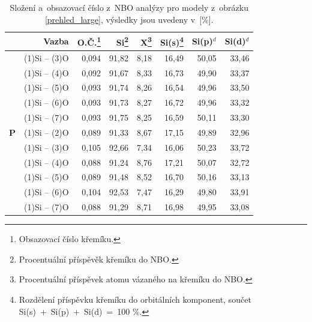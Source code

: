 \documentclass[
digital, %
table,   %
nolof,     %
nolot,     %
oneside,
]{fithesis3}
\begin{document}
\begin{table}[H]
\caption{Složení a~obsazovací číslo z~NBO analýzy pro modely z~obrázku \ref{prehled_large}, výsledky jsou uvedeny v~[\%].}
\begin{minipage}{\textwidth}
\begin{center}
\begin{tabular}{|l|r|r|r|r|r|r|r|}
\hline
\label{nbo_large}&  Vazba & O.Č.\footnote{Obsazovací číslo křemíku.} & Si\footnote{Procentuální příspěvěk křemíku do NBO.} & X\footnote{Procentuální příspěvek atomu vázaného na křemíku do NBO.} & Si(s)\footnote{Rozdělení příspěvku křemíku do orbitálních komponent, součet Si(s)~+~Si(p)~+~Si(d)~=~100 \%.} & Si(p)$^d$ &Si(d)$^d$ \\ \hline
& (1)Si -- (3)O  & 0,094 & 91,82   & 8,18   & 16,49   & 50,05   & 33,46   \\ \hline
&  (1)Si -- (4)O  & 0,092 & 91,67   & 8,33   & 16,73   & 49,90   & 33,37   \\ \hline
& (1)Si -- (5)O & 0,093 & 91,74   & 8,26   & 16,54   & 49,96   & 33,50   \\ \hline
&  (1)Si -- (6)O & 0,093 & 91,73   & 8,27   & 16,72   & 49,96   & 33,32   \\ \hline
& (1)Si -- (7)O& 0,093 & 91,75   & 8,25   & 16,59   & 50,11   & 33,30   \\ \hline
\textbf{P}& (1)Si -- (2)O  & 0,089 & 91,33   & 8,67   & 17,15   & 49,89   & 32,96   \\ \hline
&  (1)Si -- (3)O  & 0,105 & 92,66   & 7,34   & 16,06   & 50,23   & 33,72   \\ \hline
&  (1)Si -- (4)O   & 0,088 & 91,24   & 8,76   & 17,21   & 50,07   & 32,72   \\ \hline
& (1)Si -- (5)O  & 0,089 & 91,48   & 8,52   & 16,70   & 50,16   & 33,13   \\ \hline
&  (1)Si -- (6)O & 0,104 & 92,53   & 7,47   & 16,29   & 49,80   & 33,91   \\ \hline
&  (1)Si -- (7)O & 0,088 & 91,29   & 8,71   & 16,98   & 49,95   & 33,08   \\ \hline
\end{tabular}\end{center}\end{minipage}\end{table}
\end{document}
